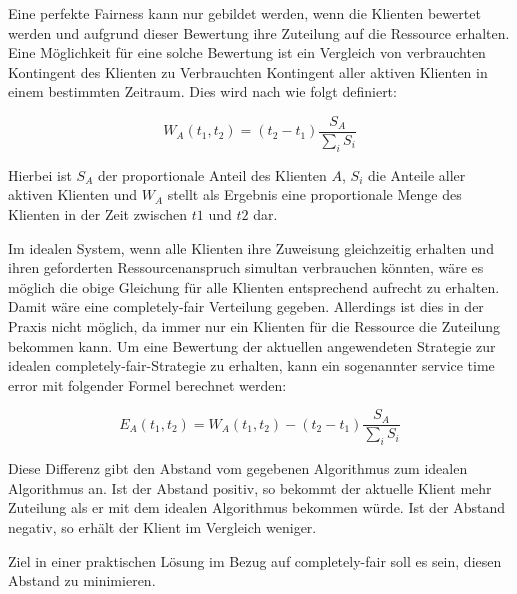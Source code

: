 Eine perfekte Fairness kann nur gebildet werden, wenn die Klienten bewertet werden und aufgrund dieser Bewertung ihre Zuteilung auf die Ressource erhalten.
Eine Möglichkeit für eine solche Bewertung ist ein Vergleich von verbrauchten Kontingent des Klienten zu Verbrauchten Kontingent aller aktiven Klienten in einem bestimmten Zeitraum. 
Dies wird nach \cite{usenix} wie folgt definiert:

\begin{equation}
W_A(t_1,t_2) = (t_2 - t_1) \frac{S_A}{\sum_i S_i}
\label{eq:perfect_fairness}
\end{equation}

Hierbei ist $S_A$ der proportionale Anteil des Klienten $A$, $S_i$ die Anteile aller aktiven Klienten und $W_A$ stellt als Ergebnis eine proportionale Menge des Klienten in der Zeit zwischen $t1$ und $t2$ dar.

Im idealen System, wenn alle Klienten ihre Zuweisung gleichzeitig erhalten und ihren geforderten Ressourcenanspruch simultan verbrauchen könnten, wäre es möglich die obige Gleichung für alle Klienten entsprechend aufrecht zu erhalten.
Damit wäre eine \glqq completely-fair\grqq{} Verteilung gegeben. Allerdings ist dies in der Praxis nicht möglich, da immer nur ein Klienten für die Ressource die Zuteilung bekommen kann.
Um eine Bewertung der aktuellen angewendeten Strategie zur idealen \glqq completely-fair\grqq-Strategie zu erhalten, kann ein sogenannter \glqq service time error\grqq{} mit folgender Formel berechnet werden:

\begin{equation}
E_A(t_1,t_2) = W_A(t_1,t_2) - (t_2 - t_1) \frac{S_A}{\sum_i S_i}
\label{eq:perfect_fairness}
\end{equation}

Diese Differenz gibt den Abstand vom gegebenen Algorithmus zum idealen Algorithmus an.
Ist der Abstand positiv, so bekommt der aktuelle Klient mehr Zuteilung als er mit dem idealen Algorithmus bekommen würde. Ist der Abstand negativ, so erhält der Klient im Vergleich weniger.

Ziel in einer praktischen Lösung im Bezug auf \glqq completely-fair\grqq{} soll es sein, diesen Abstand zu minimieren.
 



